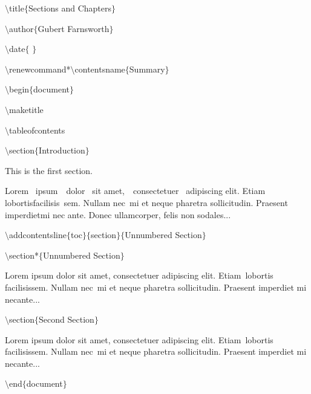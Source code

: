 $\setminus$title$ \{ $Sections and Chapters$ \} $\par

$\setminus$author$ \{ $Gubert Farnsworth$ \} $\par

$\setminus$date$ \{ $ $ \} $\par
\vspace{\baselineskip}
$\setminus$renewcommand*$\setminus$contentsname$ \{ $Summary$ \} $\par

$\setminus$begin$ \{ $document$ \} $\par

$\setminus$maketitle\par

$\setminus$tableofcontents\par

$\setminus$section$ \{ $Introduction$ \} $\par
\vspace{\baselineskip}
This is the first section.\par

\vspace{\baselineskip}
Lorem~ ipsum~~dolor~ sit  amet,~~consectetuer~ adipiscing  elit. Etiam~ lobortisfacilisis~sem.  Nullam nec~mi et neque pharetra sollicitudin.  Praesent imperdietmi nec ante. Donec ullamcorper, felis non sodales...\par


\vspace{\baselineskip}
$\setminus$addcontentsline$ \{ $toc$ \} $$ \{ $section$ \} $$ \{ $Unnumbered Section$ \} $\par

$\setminus$section*$ \{ $Unnumbered Section$ \} $\par

\vspace{\baselineskip}
Lorem ipsum dolor sit amet, consectetuer adipiscing elit. Etiam~lobortis facilisissem.  Nullam nec~mi et neque pharetra sollicitudin.  Praesent imperdiet mi necante...\par


\vspace{\baselineskip}
$\setminus$section$ \{ $Second Section$ \} $\par


Lorem ipsum dolor sit amet, consectetuer adipiscing elit. Etiam~lobortis facilisissem.  Nullam nec~mi et neque pharetra sollicitudin.  Praesent imperdiet mi necante...\par




\noindent  \hspace*{0.5in}$\setminus$end$ \{ $document$ \} $\par


